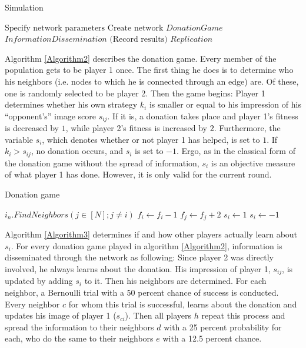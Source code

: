 \documentclass[12pt]{article}
\begin{document}
\begin{algorithm}
	\caption{Simulation}
	\label{Algorithm1}
	\begin{algorithmic}[1]
		\State $\text{Specify network parameters}$
		\State $\text{Create network}$
		\State $DonationGame$
		\State $InformationDissemination$
		\EndFor
		\State $\text{(Record results)}$
		\State $Replication$
		\EndFor
		\EndFunction
	\end{algorithmic}
\end{algorithm}

Algorithm \ref{Algorithm2} describes the donation game. Every member of the population gets to be player 1 once. The first thing he does is to determine who his neighbors (i.e. nodes to which he is connected through an edge) are. Of these, one is randomly selected to be player 2. Then the game begins: Player 1 determines whether his own strategy $k_i$ is smaller or equal to his impression of his ``opponent's'' image score $s_{ij}$. If it is, a donation takes place and player 1's fitness is decreased by $1$, while player 2's fitness is increased by $2$. Furthermore, the variable $s_i$, which denotes whether or not player 1 has helped, is set to $1$. If $k_i>s_{ij}$, no donation occurs, and $s_i$ is set to $-1$. Ergo, as in the classical form of the donation game without the spread of information, $s_i$ is an objective measure of what player 1 has done. However, it is only valid for the current round.

\begin{algorithm}
	\caption{Donation game}
	\label{Algorithm2}
	\begin{algorithmic}
		\State $i_{n}.FindNeighbors(j\in[N];j\neq i)$
		\State $f_i \gets f_i-1$
		\State $f_j \gets f_j+2$
		\State $s_{i} \gets 1$
		\Else
		\State $s_{i} \gets -1$
		\EndIf
		\EndFor
		\EndFunction
	\end{algorithmic}
\end{algorithm}

Algorithm \ref{Algorithm3} determines if and how other players actually learn about $s_i$. For every donation game played in algorithm \ref{Algorithm2}, information is disseminated through the network as following: Since player 2 was directly involved, he always learns about the donation. His impression of player 1, $s_{ij}$, is updated by adding $s_i$ to it. Then his neighbors are determined. For each neighbor, a Bernoulli trial with a 50 percent chance of success is conducted. Every neighbor $c$ for whom this trial is successful, learns about the donation and updates his image of player 1 ($s_{ci}$). Then all players $h$ repeat this process and spread the information to their neighbors $d$ with a 25 percent probability for each, who do the same to their neighbors $e$ with a 12.5 percent chance.
\end{document}
